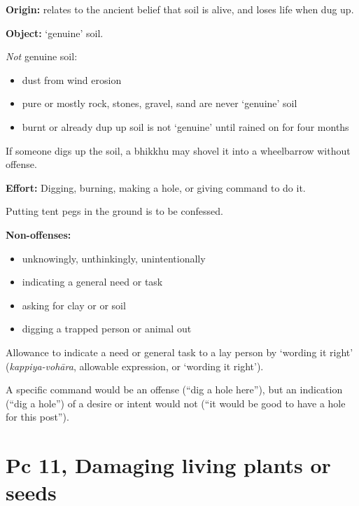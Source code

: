 \begin{multicols}{2}

\textbf{Origin:} relates to the ancient belief that soil is alive, and
loses life when dug up.

\textbf{Object:} `genuine' soil.

\emph{Not} genuine soil:

\begin{itemize}
\tightlist
\item
  dust from wind erosion
\item
  pure or mostly rock, stones, gravel, sand are never `genuine' soil
\item
  burnt or already dup up soil is not `genuine' until rained on for four
  months
\end{itemize}

If someone digs up the soil, a bhikkhu may shovel it into a wheelbarrow
without offense.

\textbf{Effort:} Digging, burning, making a hole, or giving command to
do it.

Putting tent pegs in the ground is to be confessed.

\columnbreak

\textbf{Non-offenses:}

\begin{itemize}
\tightlist
\item
  unknowingly, unthinkingly, unintentionally
\item
  indicating a general need or task
\item
  asking for clay or or soil
\item
  digging a trapped person or animal out
\end{itemize}

Allowance to indicate a need or general task to a lay person by `wording
it right' (\emph{kappiya-vohāra}, allowable expression, or `wording it
right').

A specific command would be an offense (``dig a hole here''), but an
indication (``dig a hole'') of a desire or intent would not (``it would
be good to have a hole for this post'').

\end{multicols}

\section{Pc 11, Damaging living plants or seeds}

